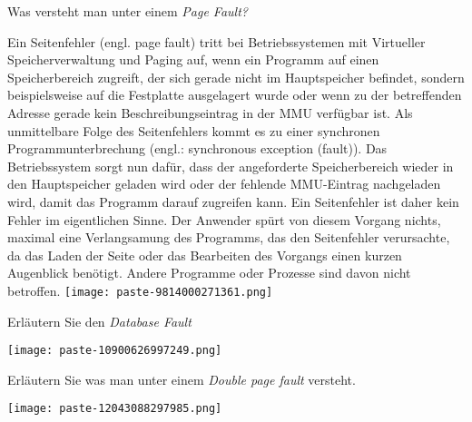 \documentclass{article}
\begin{document}
\begin{tcolorbox}[colback=white!10!white,colframe=lightgray!75!black,
  savelowerto=\jobname_ex.tex,breakable,enhanced,lines before break=40]

\begin{center}
 Was versteht man unter einem 
\textit{Page Fault?
} 

\end{center}

\tcblower

\justifying
Ein Seitenfehler (engl. page fault) tritt bei Betriebssystemen mit Virtueller Speicherverwaltung und Paging auf, wenn ein Programm auf einen Speicherbereich zugreift, der sich gerade nicht im Hauptspeicher befindet, sondern beispielsweise auf die Festplatte ausgelagert wurde oder wenn zu der betreffenden Adresse gerade kein Beschreibungseintrag in der MMU verfügbar ist. Als unmittelbare Folge des Seitenfehlers kommt es zu einer synchronen Programmunterbrechung (engl.: synchronous exception (fault)). Das Betriebssystem sorgt nun dafür, dass der angeforderte Speicherbereich wieder in den Hauptspeicher geladen wird oder der fehlende MMU-Eintrag nachgeladen wird, damit das Programm darauf zugreifen kann. Ein Seitenfehler ist daher kein Fehler im eigentlichen Sinne. Der Anwender spürt von diesem Vorgang nichts, maximal eine Verlangsamung des Programms, das den Seitenfehler verursachte, da das Laden der Seite oder das Bearbeiten des Vorgangs einen kurzen Augenblick benötigt. Andere Programme oder Prozesse sind davon nicht betroffen.
\texttt{[image: paste-9814000271361.png]}

\end{tcolorbox}
\begin{tcolorbox}[colback=white!10!white,colframe=lightgray!75!black,
  savelowerto=\jobname_ex.tex,breakable,enhanced,lines before break=40]

\begin{center}
 Erläutern Sie den 
\textit{Database Fault
} 

\end{center}

\tcblower

\justifying
\texttt{[image: paste-10900626997249.png]}

\end{tcolorbox}
\begin{tcolorbox}[colback=white!10!white,colframe=lightgray!75!black,
  savelowerto=\jobname_ex.tex,breakable,enhanced,lines before break=40]

\begin{center}
 Erläutern Sie was man unter einem 
\textit{Double page fault 
}versteht. 

\end{center}

\tcblower

\justifying
\texttt{[image: paste-12043088297985.png]}

\end{tcolorbox}
\end{document}
